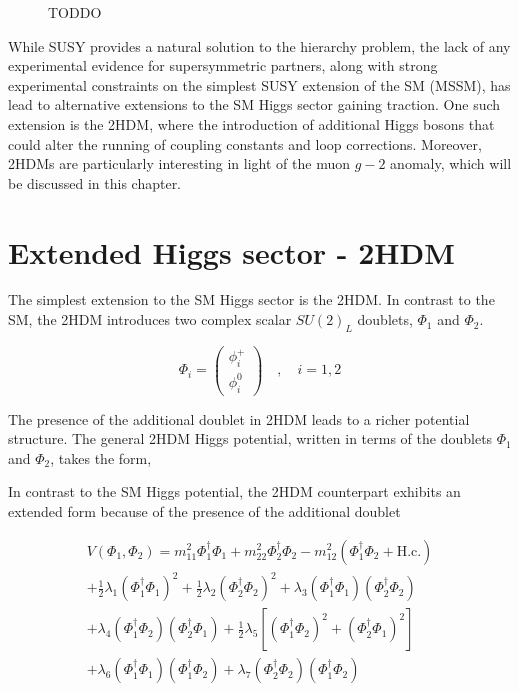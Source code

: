 \begin{figure}[h]
\centering

\caption{TODDO}
\label{Figure:Chapter2_Hierarchy_Feynman2}
\end{figure}

While SUSY provides a natural solution to the hierarchy problem, the lack of any experimental evidence for supersymmetric partners, along with strong experimental constraints on the simplest SUSY extension of the SM (MSSM), has lead to alternative extensions to the SM Higgs sector gaining traction. One such extension is the \ac{2HDM}, where the introduction of additional Higgs bosons that could alter the running of coupling constants and loop corrections. Moreover, 2HDMs are particularly interesting in light of the muon $g-2$ anomaly, which will be discussed in this chapter.

\section{Extended Higgs sector - 2HDM}

The simplest extension to the SM Higgs sector is the 2HDM. In contrast to the SM, the 2HDM introduces two complex scalar $SU(2)_L$ doublets, $\Phi_1$ and $\Phi_2$.

\begin{equation}
\Phi_i =
\begin{pmatrix}
\phi_i^{+} \\
\phi_i^{0} 
\end{pmatrix}
\quad ,\quad i = 1,2
\end{equation}

The presence of the additional doublet in 2HDM leads to a richer potential structure. The general 2HDM Higgs potential, written in terms of the doublets $\Phi_1$ and $\Phi_2$, takes the form,

In contrast to the SM Higgs potential, the 2HDM counterpart exhibits an extended form because of the presence of the additional doublet

\begin{equation}
\begin{array}{c}
    V(\Phi_1,\Phi_2) = m_{11}^2 \Phi_1^{\dagger}\Phi_1 + m_{22}^2 \Phi_2^{\dagger}\Phi_2 - m_{12}^2(\Phi_1^\dagger\Phi_2 + \text{H.c.}) \\
    + \frac{1}{2} \lambda_1(\Phi_1^\dagger\Phi_1)^2 + \frac{1}{2}\lambda_2(\Phi_2^\dagger\Phi_2)^2 + \lambda_3(\Phi_1^\dagger\Phi_1)(\Phi_2^\dagger\Phi_2) \\
    + \lambda_4(\Phi_1^\dagger\Phi_2)(\Phi_2^\dagger\Phi_1) + \frac{1}{2}\lambda_5[(\Phi_1^\dagger\Phi_2)^2 + (\Phi_2^\dagger\Phi_1)^2] \\
    + \lambda_6(\Phi_1^\dagger\Phi_1)(\Phi_1^\dagger\Phi_2) + \lambda_7(\Phi_2^\dagger\Phi_2)(\Phi_1^\dagger\Phi_2)
\end{array}
\end{equation}

